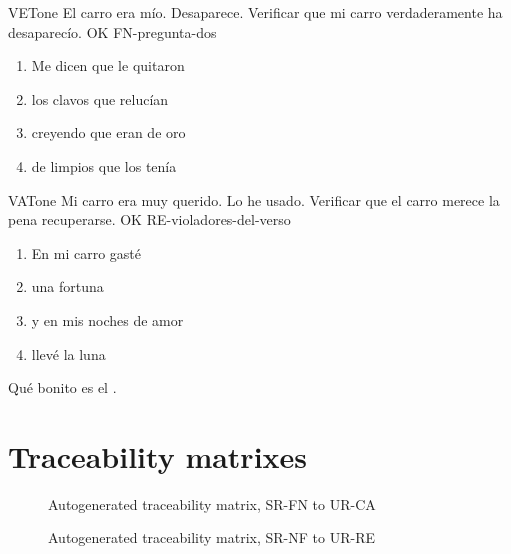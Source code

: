 \documentclass[a4paper,10pt]{article}
\begin{document}
  \printtesttemplate

  \begin{testCase}{VET}{one}
    {El carro era mío.}  %
    {Desaparece.}  %
    {Verificar que mi carro verdaderamente ha desaparecío.}  %
    {OK}  %
    {FN-pregunta-dos}  %
    \begin{enumerate}[leftmargin=*, topsep=0pt, noitemsep]
      \item Me dicen que le quitaron
      \item los clavos que relucían
      \item creyendo que eran de oro
      \item de limpios que los tenía
    \end{enumerate}
  \end{testCase}

  \begin{testCase}{VAT}{one}
    {Mi carro era muy querido.}  %
    {Lo he usado.}  %
    {Verificar que el carro merece la pena recuperarse.}  %
    {OK}  %
    {RE-violadores-del-verso}  %
    \begin{enumerate}[leftmargin=*, topsep=0pt, noitemsep]
      \item En mi carro gasté
      \item una fortuna
      \item y en mis noches de amor
      \item llevé la luna
    \end{enumerate}
  \end{testCase}


  Qué bonito es el .

  \FloatBarrier



  \section{Traceability matrixes}

  \begin{figure}[htbp]
    \centering\traceabilityFNCA
    \caption{Autogenerated traceability matrix, SR-FN to UR-CA}
  \end{figure}

  \begin{figure}[htbp]
    \centering\traceabilityNFRE
    \caption{Autogenerated traceability matrix, SR-NF to UR-RE}
  \end{figure}
\end{document}
